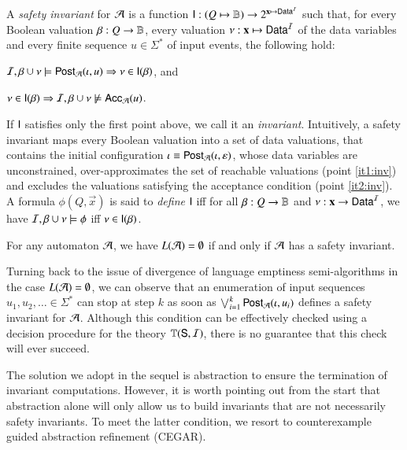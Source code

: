 \documentclass[10pt]{llncs}
\begin{document}
A \emph{safety invariant} for $\mathcal{A}$ is a function $\mathsf{I} : (Q \mapsto
\mathbb{B}) \rightarrow 2^{\mathbf x \mapsto \mathsf{Data}^{\mathcal{I}}}$ such that, for every
Boolean valuation $\beta : Q \rightarrow \mathbb{B}$, every valuation $\nu
: \mathbf x \mapsto \mathsf{Data}^{\mathcal{I}}$ of the data variables and every finite
sequence $u \in \Sigma^*$ of input events, the following
hold: \begin{compactenum}
%
\item\label{it1:inv} $\mathcal{I},\beta \cup \nu \models \mathsf{Post}_{\mathcal{A}}(\iota,u)
  \Rightarrow \nu \in \mathsf{I}(\beta)$, and
%
\item\label{it2:inv} $\nu \in \mathsf{I}(\beta) \Rightarrow \mathcal{I},\beta \cup
  \nu \not\models \mathsf{Acc}_{\mathcal{A}}(u)$.
\end{compactenum}
If $\mathsf{I}$ satisfies only the first point above, we call it an
\emph{invariant}. Intuitively, a safety invariant maps every Boolean
valuation into a set of data valuations, that contains the initial
configuration $\iota \equiv \mathsf{Post}_{\mathcal{A}}(\iota,\varepsilon)$, whose data
variables are unconstrained, over-approximates the set of reachable
valuations (point \ref{it1:inv}) and excludes the valuations satisfying the
acceptance condition (point \ref{it2:inv}).  A formula $\phi(Q,\vec{x})$
is said to \emph{define} $\mathsf{I}$ iff for all $\beta: Q \rightarrow \mathbb{B}$ and
$\nu : \mathbf x \rightarrow \mathsf{Data}^{\mathcal{I}}$, we have $\mathcal{I},\beta\cup\nu \models
\phi$ iff $\nu \in \mathsf{I}(\beta)$.

\begin{lemma}\label{lemma:safety-invariant}
  For any automaton $\mathcal{A}$, we have $L(\mathcal{A}) = \emptyset$ if and only if
  $\mathcal{A}$ has a safety invariant.
\end{lemma}

Turning back to the issue of divergence of language emptiness
semi-algorithms in the case $L(\mathcal{A}) = \emptyset$, we can observe that
an enumeration of input sequences $u_1,u_2,\ldots \in \Sigma^*$ can
stop at step $k$ as soon as $\bigvee_{i=1}^k \mathsf{Post}_{\mathcal{A}}(\iota,u_i)$
defines a safety invariant for $\mathcal{A}$. Although this condition can be
effectively checked using a decision procedure for the theory
$\mathbb{T}(\mathsf{S},\mathcal{I})$, there is no guarantee that this check will ever
succeed.

The solution we adopt in the sequel is abstraction to ensure the
termination of invariant computations. However, it is worth pointing
out from the start that abstraction alone will only allow us to build
invariants that are not necessarily safety invariants. To meet the
latter condition, we resort to counterexample guided abstraction
refinement (CEGAR).
\end{document}
